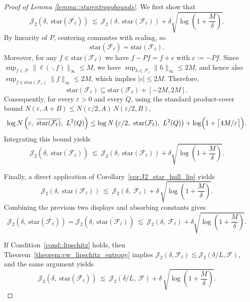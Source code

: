 \documentclass[11pt]{article}
\theoremstyle{plain}
\theoremstyle{definition} %
\begin{document}
\begin{proof}[Proof of Lemma \ref{lemma::starentropybounds}]
We first show that
\[
\mathcal J_2\left(\delta,\ \mathrm{star}(\overline{\mathcal{F}_{\ell}})\right)
\ \lesssim\
\mathcal J_2\left(\delta,\ \mathrm{star}(\mathcal{F}_{\ell})\right)
+
\delta\sqrt{\log\left(1+\frac{M}{\delta}\right)}.
\]
By linearity of $P$, centering commutes with scaling, so
\[
\mathrm{star}(\overline{\mathcal{F}}_{\ell})
=
\overline{\mathrm{star}(\mathcal{F}_{\ell})}.
\]
Moreover, for any $f\in \mathrm{star}(\mathcal{F}_{\ell})$ we have
$f-Pf = f + c$ with $c:=-Pf$. Since $\sup_{f\in\mathcal{F}}\|\ell(\cdot,f)\|_\infty\le M$, we have
$\sup_{h\in\mathcal F_\ell}\|h\|_\infty\le 2M$, and hence also
$\sup_{f\in\mathrm{star}(\mathcal F_\ell)}\|f\|_\infty\le 2M$, which implies $|c|\le 2M$. Therefore,
\[
\overline{\mathrm{star}(\mathcal{F}_{\ell})}
\subseteq
\mathrm{star}(\mathcal{F}_{\ell}) + [-2M,2M].
\]
Consequently, for every $\varepsilon>0$ and every $Q$, using the standard product-cover bound
$N(\varepsilon,A+B)\le N(\varepsilon/2,A)\,N(\varepsilon/2,B)$,
\[
\log N\left(\varepsilon,\ \overline{\mathrm{star}(\mathcal{F}_{\ell})},\ L^2(Q)\right)
\le
\log N\left(\varepsilon/2,\ \mathrm{star}(\mathcal{F}_{\ell}),\ L^2(Q)\right)
+
\log\Bigl(1+\bigl\lceil 4M/\varepsilon\bigr\rceil\Bigr).
\]
Integrating this bound yields
\[
\mathcal J_2\left(\delta,\ \overline{\mathrm{star}(\mathcal{F}_{\ell})}\right)
\ \lesssim\
\mathcal J_2\left(\delta,\ \mathrm{star}(\mathcal{F}_{\ell})\right)
+
\delta\sqrt{\log\left(1+\frac{M}{\delta}\right)}.
\]

Finally, a direct application of Corollary~\ref{cor:J2_star_hull_lip} yields
\[
\mathcal J_2\left(\delta,\ \mathrm{star}(\mathcal{F}_{\ell})\right)
\ \lesssim\
\mathcal J_2\left(\delta,\ \mathcal{F}_{\ell}\right)
+
\delta\,\sqrt{\log\left(1+\frac{M}{\delta}\right)}.
\]
Combining the previous two displays and absorbing constants gives
\[
\mathcal J_2\left(\delta,\ \mathrm{star}(\overline{\mathcal{F}_{\ell}})\right)
=
\mathcal J_2\left(\delta,\ \overline{\mathrm{star}(\mathcal{F}_{\ell})}\right)
\ \lesssim\
\mathcal J_2\left(\delta,\ \mathcal{F}_{\ell}\right)
+
\delta\sqrt{\log\left(1+\frac{M}{\delta}\right)}.
\]

If Condition~\ref{cond::lipschitz} holds, then Theorem~\ref{theorem:vw_lipschitz_entropy} implies
$\mathcal J_2(\delta,\mathcal F_\ell)\lesssim \mathcal J_2(\delta/L,\mathcal F)$, and the same argument yields
\[
\mathcal J_2\left(\delta,\ \mathrm{star}(\overline{\mathcal{F}_{\ell}})\right)
\ \lesssim\
\mathcal J_2\left(\delta/L,\ \mathcal{F}\right)
+
\delta\,\sqrt{\log\left(1+\frac{M}{\delta}\right)}.
\]
\end{proof}
\end{document}
